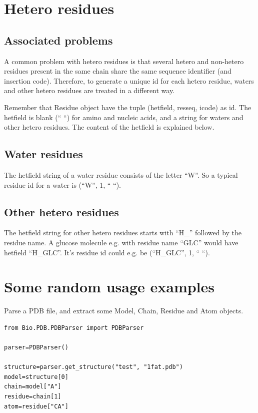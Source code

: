 \documentclass{report}
\begin{document}
\section{Hetero residues}

\subsection{Associated problems\label{hetero probems}}

A common problem with hetero residues is that several hetero and non-hetero
residues present in the same chain share the same sequence identifier (and insertion
code). Therefore, to generate a unique id for each hetero residue, waters and
other hetero residues are treated in a different way.

Remember that Residue object have the tuple (hetfield, resseq, icode) as id.
The hetfield is blank ({}`` {}``) for amino and nucleic acids, and a string
for waters and other hetero residues. The content of the hetfield is explained
below.

\subsection{Water residues}

The hetfield string of a water residue consists of the letter {}``W{}''. So
a typical residue id for a water is ({}``W{}'', 1, {}`` {}``).

\subsection{Other hetero residues}

The hetfield string for other hetero residues starts with {}``H\_{}'' followed
by the residue name. A glucose molecule e.g. with residue name {}``GLC{}''
would have hetfield {}``H\_GLC{}''. It's residue id could e.g. be ({}``H\_GLC{}'',
1, {}`` {}``).

\section{Some random usage examples}

Parse a PDB file, and extract some Model, Chain, Residue and Atom objects.

\begin{verbatim}
from Bio.PDB.PDBParser import PDBParser

parser=PDBParser()

structure=parser.get_structure("test", "1fat.pdb")
model=structure[0]
chain=model["A"]
residue=chain[1]
atom=residue["CA"]
\end{verbatim}
\end{document}
